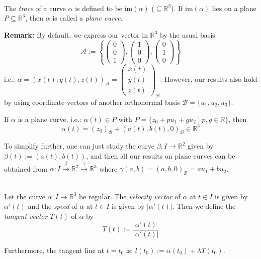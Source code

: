\\
The \textit{trace} of a curve $\alpha$ is defined to be $\mathrm{im}(\alpha)$ ($\subseteq \mathbb{R}^3$). If $\mathrm{im}(\alpha)$ lies on a plane $P\subseteq\mathbb{R}^3$, then $\alpha$ is called a \textit{plane curve}.

\noindent\textbf{Remark:} By default, we express our vector in $\mathbb{R}^3$ by the usual basis
\[
\mathcal{A} := \left\{\begin{pmatrix}0\\0\\1\end{pmatrix}, \begin{pmatrix}1\\0\\0\end{pmatrix}, \begin{pmatrix}0\\1\\0\end{pmatrix}\right\}
\]
i.e.: $\alpha=(x(t),y(t),z(t))_{\mathcal{A}} = \begin{pmatrix}x(t)\\y(t)\\z(t)\end{pmatrix}_{\mathcal{B}}$. However, our results also hold by using coordinate vectors of another orthonormal basis $\mathcal{B}=\{u_1, u_2, u_3\}$.

\noindent If $\alpha$ is a plane curve, i.e.: $\alpha(t)\in P$ with $P=\{z_0+pu_1+gu_2\mid p,g\in\mathbb{R}\}$, then
\[
\alpha(t) = (z_0)_{\mathcal{B}} + (a(t), b(t),0)_{\mathcal{B}} \in\mathbb{R}^3
\]

\noindent To simplify further, one can just study the curve $\beta:I\to\mathbb{R}^2$ given by $\beta(t):=(a(t),b(t))$, and then all our results on plane curves can be obtained from $\alpha: I\xrightarrow{\beta}\mathbb{R}^2\xrightarrow{\gamma}\mathbb{R}^3$ where $\gamma (a,b)=(a,b,0)_{\mathcal{B}}=au_1+bu_2$.

\\
Let the curve $\alpha:I\to\mathbb{R}^3$ be regular. The \textit{velocity vector} of $\alpha$ at $t\in I$ is given by $\alpha'(t)$ and the \textit{speed} of $\alpha$ at $t\in I$ is given by $|\alpha'(t)|$. Then we define the \textit{tangent vector} $T(t)$ of $\alpha$ by
\[
T(t) := \frac{\alpha'(t)}{|\alpha'(t)|}
\]

\noindent Furthermore, the tangent line at $t=t_0$ is: $l(t_0) := \alpha(t_0)+\lambda T(t_0)$.

